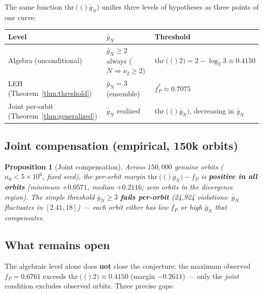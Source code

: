 \documentclass[12pt,reqno]{amsart}
\theoremstyle{plain}
\newtheorem{proposition}[theorem]{Proposition}
\theoremstyle{definition}
\newcommand{\nuTwo}{\nu_2}
\newcommand{\fP}{f_P}
\newcommand{\thr}[1]{\mathrm{thr}\!\left(#1\right)}
\begin{document}
The same function $\thr(\bar g_N)$ unifies three levels of hypotheses as
three points of one curve:

\begin{center}
\begin{tabular}{lll}
\hline
Level & $\bar g_N$ & Threshold \\
\hline
Algebra (unconditional) & $\bar g_N \ge 2$ always ($N \Rightarrow \nuTwo \ge 2$) & $\thr(2) = 2 - \log_2 3 \approx 0.4150$ \\
LEH (Theorem~\ref{thm:threshold}) & $\bar g_N = 3$ (ensemble) & $f_P^* \approx 0.7075$ \\
Joint per-orbit (Theorem~\ref{thm:generalized}) & $\bar g_N$ realized & $\thr(\bar g_N)$, decreasing in $\bar g_N$ \\
\hline
\end{tabular}
\end{center}

\subsection{Joint compensation (empirical, 150k orbits)}\label{sec:joint}

\begin{proposition}[Joint compensation]\label{prop:joint}
Across $150{,}000$ genuine orbits ($n_0 < 5 \times 10^6$, fixed seed), the
per-orbit margin $\thr(\bar g_N) - \fP$ is \textbf{positive in all orbits}
(minimum $+0.0571$, median $+0.2116$; zero orbits in the divergence region).
The \emph{simple} threshold $\bar g_N \ge 3$ \textbf{fails per-orbit}
(24{,}924 violations: $\bar g_N$ fluctuates in $[2.41, 18]$) --- each orbit
either has low $\fP$ or high $\bar g_N$ that compensates.
\end{proposition}

\subsection{What remains open}\label{sec:open}

The algebraic level alone does \textbf{not} close the conjecture: the maximum
observed $\fP = 0.6761$ exceeds $\thr(2) \approx 0.4150$ (margin $-0.2611$) ---
only the \emph{joint} condition excludes observed orbits. Three precise gaps:
\end{document}
